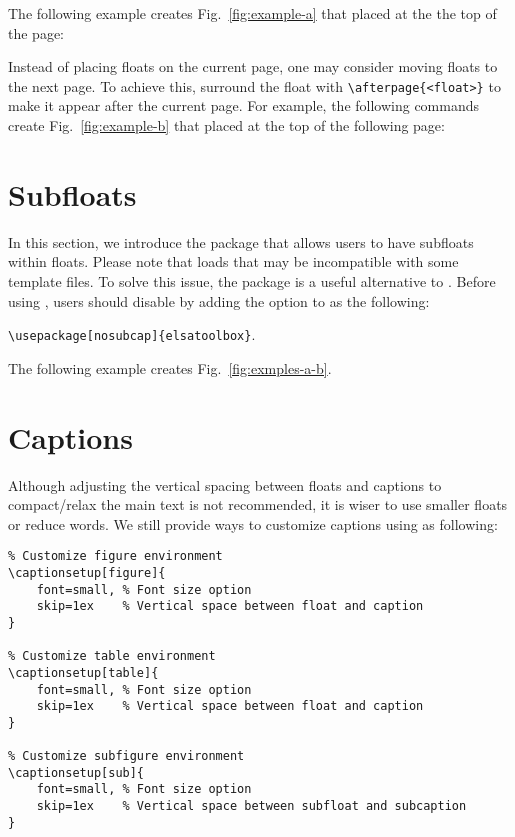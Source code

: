\bigskip

The following example creates Fig.~\ref{fig:example-a} that placed at the the top of the page:

\bigskip




Instead of placing floats on the current page, one may consider moving floats to the next page. To achieve this, surround the float with \verb|\afterpage{<float>}| to make it appear after the current page. For example, the following commands create Fig.~\ref{fig:example-b} that placed at the top of the following page:

\bigskip




\section{Subfloats}
\label{content:floats:subfloats}

In this section, we introduce the  package that allows users to have subfloats within floats. Please note that \elsatoolbox{} loads  that may be incompatible with some template files. To solve this issue, the  package is a useful alternative to . Before using , users should disable  by adding the option  to \elsatoolbox{} as the following:

\begin{center} 
    \verb|\usepackage[nosubcap]{elsatoolbox}|.
\end{center}

The following example creates Fig.~\ref{fig:exmples-a-b}.

\bigskip




\section{Captions}
\label{content:floats:captions}

Although adjusting the vertical spacing between floats and captions to compact/relax the main text is not recommended, it is wiser to use smaller floats or reduce words. We still provide ways to customize captions using  as following:

\bigskip

\begin{lstlisting}
% Customize figure environment
\captionsetup[figure]{
    font=small, % Font size option
    skip=1ex    % Vertical space between float and caption
}

% Customize table environment
\captionsetup[table]{
    font=small, % Font size option
    skip=1ex    % Vertical space between float and caption
}

% Customize subfigure environment
\captionsetup[sub]{
    font=small, % Font size option
    skip=1ex    % Vertical space between subfloat and subcaption
}
\end{lstlisting}